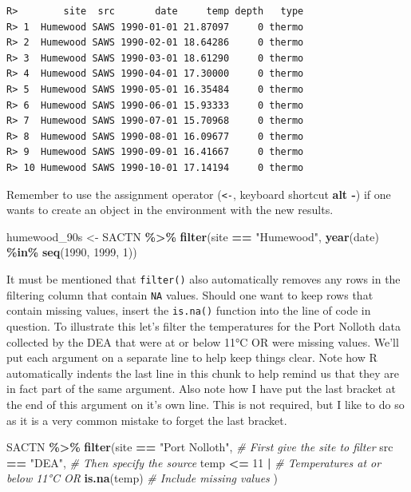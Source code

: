 \documentclass[
]{book}
\newenvironment{Shaded}{\begin{snugshade}}{\end{snugshade}}
\newcommand{\CommentTok}[1]{\textcolor[rgb]{0.56,0.35,0.01}{\textit{#1}}}
\newcommand{\DecValTok}[1]{\textcolor[rgb]{0.00,0.00,0.81}{#1}}
\newcommand{\KeywordTok}[1]{\textcolor[rgb]{0.13,0.29,0.53}{\textbf{#1}}}
\newcommand{\NormalTok}[1]{#1}
\newcommand{\OperatorTok}[1]{\textcolor[rgb]{0.81,0.36,0.00}{\textbf{#1}}}
\newcommand{\StringTok}[1]{\textcolor[rgb]{0.31,0.60,0.02}{#1}}
\begin{document}
\begin{verbatim}
R>        site  src       date     temp depth   type
R> 1  Humewood SAWS 1990-01-01 21.87097     0 thermo
R> 2  Humewood SAWS 1990-02-01 18.64286     0 thermo
R> 3  Humewood SAWS 1990-03-01 18.61290     0 thermo
R> 4  Humewood SAWS 1990-04-01 17.30000     0 thermo
R> 5  Humewood SAWS 1990-05-01 16.35484     0 thermo
R> 6  Humewood SAWS 1990-06-01 15.93333     0 thermo
R> 7  Humewood SAWS 1990-07-01 15.70968     0 thermo
R> 8  Humewood SAWS 1990-08-01 16.09677     0 thermo
R> 9  Humewood SAWS 1990-09-01 16.41667     0 thermo
R> 10 Humewood SAWS 1990-10-01 17.14194     0 thermo
\end{verbatim}

Remember to use the assignment operator (\texttt{\textless{}-}, keyboard shortcut \textbf{alt -}) if one wants to create an object in the environment with the new results.

\begin{Shaded}
\begin{Highlighting}[]
\NormalTok{humewood\_90s <{-}}\StringTok{ }\NormalTok{SACTN }\OperatorTok{\%>\%}\StringTok{ }
\StringTok{  }\KeywordTok{filter}\NormalTok{(site }\OperatorTok{==}\StringTok{ "Humewood"}\NormalTok{, }\KeywordTok{year}\NormalTok{(date) }\OperatorTok{\%in\%}\StringTok{ }\KeywordTok{seq}\NormalTok{(}\DecValTok{1990}\NormalTok{, }\DecValTok{1999}\NormalTok{, }\DecValTok{1}\NormalTok{))}
\end{Highlighting}
\end{Shaded}

It must be mentioned that \texttt{filter()} also automatically removes any rows in the filtering column that contain \texttt{NA} values. Should one want to keep rows that contain missing values, insert the \texttt{is.na()} function into the line of code in question. To illustrate this let's filter the temperatures for the Port Nolloth data collected by the DEA that were at or below 11°C OR were missing values. We'll put each argument on a separate line to help keep things clear. Note how R automatically indents the last line in this chunk to help remind us that they are in fact part of the same argument. Also note how I have put the last bracket at the end of this argument on it's own line. This is not required, but I like to do so as it is a very common mistake to forget the last bracket.

\begin{Shaded}
\begin{Highlighting}[]
\NormalTok{SACTN }\OperatorTok{\%>\%}\StringTok{ }
\StringTok{  }\KeywordTok{filter}\NormalTok{(site }\OperatorTok{==}\StringTok{ "Port Nolloth"}\NormalTok{, }\CommentTok{\# First give the site to filter}
\NormalTok{         src }\OperatorTok{==}\StringTok{ "DEA"}\NormalTok{, }\CommentTok{\# Then specify the source}
\NormalTok{         temp }\OperatorTok{<=}\StringTok{ }\DecValTok{11} \OperatorTok{|}\StringTok{ }\CommentTok{\# Temperatures at or below 11°C OR}
\StringTok{           }\KeywordTok{is.na}\NormalTok{(temp) }\CommentTok{\# Include missing values}
\NormalTok{         )}
\end{Highlighting}
\end{Shaded}
\end{document}
